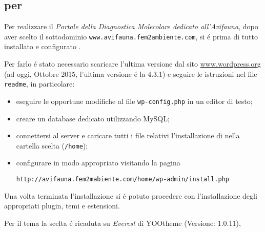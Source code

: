 \subsection{{\wp} per {\fem}}

Per realizzare il \emph{Portale della Diagnostica Molecolare dedicato all'Avifauna}, dopo aver scelto il sottodominio \texttt{www.avifauna.fem2ambiente.com}, si é prima di tutto installato e configurato {\wp}.

Per farlo é stato necessario scaricare l'ultima versione dal sito \url{www.wordpress.org} (ad oggi, Ottobre 2015, l'ultima versione é la 4.3.1) e seguire le istruzioni nel file \texttt{readme}, in particolare:
\begin{itemize}
\item eseguire le opportune modifiche al file \texttt{wp-config.php} in un editor di testo;
\item creare un database dedicato utilizzando MySQL;
\item connettersi al server e caricare tutti i file relativi l'installazione di {\wp} nella cartella scelta (\texttt{/home});
\item configurare in modo appropriato visitando la pagina 

\texttt{http://avifauna.fem2mabiente.com/home/wp-admin/install.php}
\end{itemize}

Una volta terminata l'installazione si é potuto procedere con l'installazione degli appropriati plugin, temi e estensioni.

Per il tema la scelta é ricaduta su \emph{Everest} di YOOtheme (Versione: 1.0.11), 
